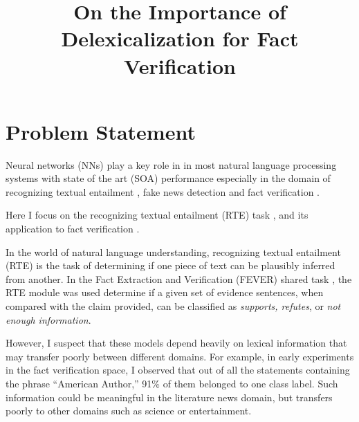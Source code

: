 \documentclass[compsoc,onecolumn]{IEEEtran}
\begin{document}
\title{On the Importance of Delexicalization for Fact Verification}


\author{\IEEEauthorblockN{}
}



\maketitle



\section{Problem Statement}
Neural networks (NNs)  play a key role in in most natural language processing systems with state of the art (SOA) performance \cite{devlin2018bert, sun2018improving,bohnet2018morphosyntactic} especially in the domain of recognizing textual entailment \cite{kim2018semantic}, fake news detection \cite{baird2017talos} and fact verification \cite{nie2018combining}.


Here I focus on the recognizing textual entailment (RTE) task \cite{dagan2013recognizing}, and its application to fact verification \cite{thorne2018fever}.

In the world of natural language understanding, recognizing textual entailment (RTE) is the task of determining if one piece of text can be plausibly inferred from another. In the Fact Extraction and Verification (FEVER) shared task \cite{thorne2018fever}, the RTE module was used determine if a given set of evidence sentences, when compared with the claim provided, can be classified as \textit{supports, refutes}, or \textit{not enough information}.


However, I suspect that these models depend heavily on lexical information that may transfer poorly between different domains. For example, in early experiments in the fact verification space, I observed that out of all the statements containing the phrase ``American Author,'' 91\% of them belonged to one class label. Such information could be meaningful in the literature news domain, but transfers poorly to other domains such as science or entertainment. 
\end{document}
